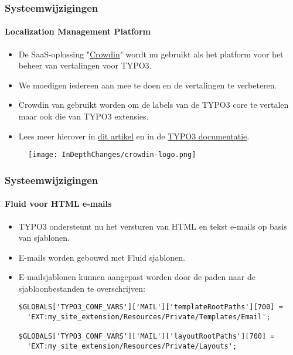 
\begin{frame}[fragile]
	\frametitle{Systeemwijzigingen}
	\framesubtitle{Localization Management Platform}

	\begin{itemize}
		\item De SaaS-oplossing "\href{https://crowdin.com/}{Crowdin}" wordt nu gebruikt als
			het platform voor het beheer van vertalingen voor TYPO3.
		\item We moedigen iedereen aan mee te doen en de vertalingen te verbeteren.
		\item Crowdin van gebruikt worden om de labels van de TYPO3 core te vertalen
			maar ook die van TYPO3 extensies.
		\item Lees meer hierover in
			\href{https://typo3.org/community/teams/typo3-development/initiatives/localization-with-crowdin/}{dit artikel}
			en in de
			\href{https://docs.typo3.org/m/typo3/reference-coreapi/master/en-us/ApiOverview/Internationalization/TranslationServer/Crowdin.html}{TYPO3 documentatie}.
	\end{itemize}

	\begin{figure}
		\texttt{[image: InDepthChanges/crowdin-logo.png]}
	\end{figure}

\end{frame}


\begin{frame}[fragile]
	\frametitle{Systeemwijzigingen}
	\framesubtitle{Fluid voor HTML e-mails}

	\lstset{basicstyle=\smaller\ttfamily}

	\begin{itemize}
		\item TYPO3 ondersteunt nu het versturen van HTML en tekst e-mails op basis van sjablonen.
		\item E-mails worden gebouwd met Fluid sjablonen.
		\item E-mailsjablonen kunnen aangepast worden door de paden naar de sjabloonbestanden te overschrijven:
\begin{lstlisting}
$GLOBALS['TYPO3_CONF_VARS']['MAIL']['templateRootPaths'][700] =
  'EXT:my_site_extension/Resources/Private/Templates/Email';

$GLOBALS['TYPO3_CONF_VARS']['MAIL']['layoutRootPaths'][700] =
  'EXT:my_site_extension/Resources/Private/Layouts';
\end{lstlisting}

	\end{itemize}

\end{frame}


